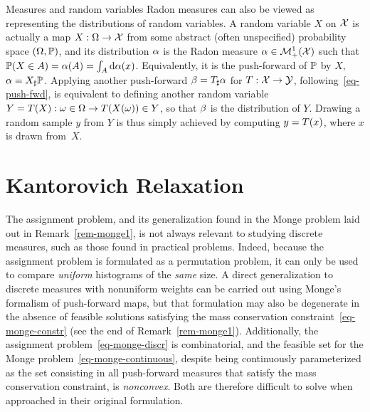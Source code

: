 \begin{rem2}{Measures and random variables}\label{rem-meas-random}
	Radon measures can also be viewed as representing the distributions of random variables. A random variable $X$ on $\mathcal{X}$ is actually a map $X : \Omega \rightarrow \mathcal{X}$ from some abstract (often unspecified) probability space $(\Omega,\mathbb{P})$, and its distribution $\alpha$ is the Radon measure $\alpha \in \mathcal{M}_+^1(\mathcal{X})$ such that $\mathbb{P}(X \in A) = \alpha(A)=\int_A \mathrm{d}\alpha(x)$.
	Equivalently, it is the push-forward of $\mathbb{P}$ by $X$, $\alpha=X_\sharp\mathbb{P}$.
	Applying another push-forward $\beta = T_\sharp\alpha$ for $T : \mathcal{X} \rightarrow \mathcal{Y}$, following~\eqref{eq-push-fwd}, is equivalent to defining another random variable $Y=T(X) : \omega \in \Omega \rightarrow T(X(\omega)) \in Y$, so that $\beta$ is the distribution of $Y$.
	Drawing a random sample $y$ from $Y$ is thus simply achieved by computing $y=T(x)$, where $x$ is drawn from~$X$.
\end{rem2}


\section{Kantorovich Relaxation}\label{sec-kantorovich-relaxation}


The assignment problem, and its generalization found in the Monge problem laid out in Remark~\ref{rem-monge1}, is not always relevant to studying discrete measures, such as those found in practical problems. Indeed, because the assignment problem is formulated as a permutation problem, it can only be used to compare \emph{uniform} histograms of the \emph{same} size. A direct generalization to discrete measures with nonuniform weights can be carried out using Monge's formalism of push-forward maps, but that formulation may also be degenerate in the absence of feasible solutions satisfying the mass conservation constraint~\eqref{eq-monge-constr} (see the end of Remark~\ref{rem-monge1}). Additionally, the assignment problem~\eqref{eq-monge-discr} is combinatorial, and the feasible set for the Monge problem~\eqref{eq-monge-continuous}, despite being continuously parameterized as the set consisting in all push-forward measures that satisfy the mass conservation constraint, is \emph{nonconvex}. Both are therefore difficult to solve when approached in their original formulation.


